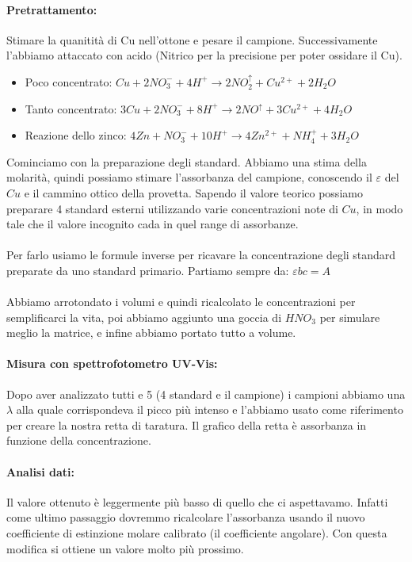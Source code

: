 \documentclass{article}
\begin{document}
\paragraph{Pretrattamento:} Stimare la quanitità di Cu nell'ottone e pesare il campione. Successivamente l'abbiamo attaccato con acido (Nitrico per la precisione per poter ossidare il Cu).
\begin{itemize}
	\item Poco concentrato: $Cu + 2NO_3^- + 4H^+ \rightarrow 2NO_2^\uparrow + Cu^{2+} + 2H_2O$ 
	\item Tanto concentrato: $3Cu + 2NO_3^- + 8H^+ \rightarrow 2NO^\uparrow + 3Cu^{2+} + 4H_2O$
	\item Reazione dello zinco: $4Zn + NO_3^- + 10H^+ \rightarrow 4Zn^{2+} + NH_4^+ + 3H_2O$
\end{itemize}
%
Cominciamo con la preparazione degli standard. Abbiamo una stima della molarità, quindi possiamo stimare l'assorbanza del campione, conoscendo il $\varepsilon$ del $Cu$ e il cammino ottico della provetta. Sapendo il valore teorico possiamo preparare 4 standard esterni utilizzando varie concentrazioni note di $Cu$, in modo tale che il valore incognito cada in quel range di assorbanze.
\\\\
Per farlo usiamo le formule inverse per ricavare la concentrazione degli standard preparate da uno standard primario. Partiamo sempre da: $\varepsilon b c = A$
\\\\
Abbiamo arrotondato i volumi e quindi ricalcolato le concentrazioni per semplificarci la vita, poi abbiamo aggiunto una goccia di $HNO_3$ per simulare meglio la matrice, e infine abbiamo portato tutto a volume.

\paragraph{Misura con spettrofotometro UV-Vis:} Dopo aver analizzato tutti e 5 (4 standard e il campione) i campioni abbiamo una $\lambda$ alla quale corrispondeva il picco più intenso e l'abbiamo usato come riferimento per creare la nostra retta di taratura. Il grafico della retta è assorbanza in funzione della concentrazione.

\paragraph{Analisi dati:} Il valore ottenuto è leggermente più basso di quello che ci aspettavamo. Infatti come ultimo passaggio dovremmo ricalcolare l'assorbanza usando il nuovo coefficiente di estinzione molare calibrato (il coefficiente angolare). Con questa modifica si ottiene un valore molto più prossimo.
\end{document}
